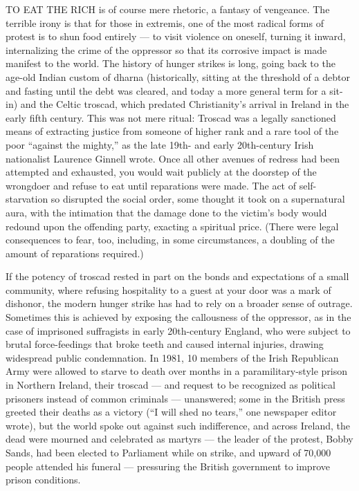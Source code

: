 TO EAT THE RICH is of course mere rhetoric, a fantasy of vengeance. The
terrible irony is that for those in extremis, one of the most radical
forms of protest is to shun food entirely --- to visit violence on
oneself, turning it inward, internalizing the crime of the oppressor so
that its corrosive impact is made manifest to the world. The history of
hunger strikes is long, going back to the age-old Indian custom of
dharna (historically, sitting at the threshold of a debtor and fasting
until the debt was cleared, and today a more general term for a sit-in)
and the Celtic troscad, which predated Christianity's arrival in Ireland
in the early fifth century. This was not mere ritual: Troscad was a
legally sanctioned means of extracting justice from someone of higher
rank and a rare tool of the poor ``against the mighty,'' as the late
19th- and early 20th-century Irish nationalist Laurence Ginnell wrote.
Once all other avenues of redress had been attempted and exhausted, you
would wait publicly at the doorstep of the wrongdoer and refuse to eat
until reparations were made. The act of self-starvation so disrupted the
social order, some thought it took on a supernatural aura, with the
intimation that the damage done to the victim's body would redound upon
the offending party, exacting a spiritual price. (There were legal
consequences to fear, too, including, in some circumstances, a doubling
of the amount of reparations required.)

If the potency of troscad rested in part on the bonds and expectations
of a small community, where refusing hospitality to a guest at your door
was a mark of dishonor, the modern hunger strike has had to rely on a
broader sense of outrage. Sometimes this is achieved by exposing the
callousness of the oppressor, as in the case of imprisoned suffragists
in early 20th-century England, who were subject to brutal force-feedings
that broke teeth and caused internal injuries, drawing widespread public
condemnation. In 1981, 10 members of the Irish Republican Army were
allowed to starve to death over months in a paramilitary-style prison in
Northern Ireland, their troscad --- and request to be recognized as
political prisoners instead of common criminals --- unanswered; some in
the British press greeted their deaths as a victory (``I will shed no
tears,'' one newspaper editor wrote), but the world spoke out against
such indifference, and across Ireland, the dead were mourned and
celebrated as martyrs --- the leader of the protest, Bobby Sands, had
been elected to Parliament while on strike, and upward of 70,000 people
attended his funeral --- pressuring the British government to improve
prison conditions.

